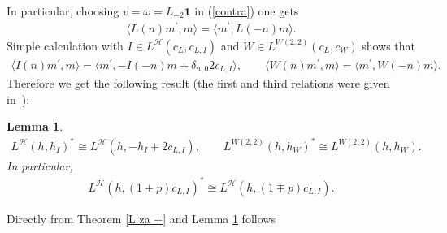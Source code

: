 \documentclass[11pt]{article}
\numberwithin{equation}{section}
\newtheorem{Lemma}[Theorem]{Lemma}
\newcommand{\HVir}{\mathcal H}
\begin{document}
In particular, choosing $v=\omega =L_{-2}\boldsymbol{1}$ in (\ref{contra}) one gets
\begin{gather*}
\langle L(n) m^{\prime },m\rangle =\langle m^{\prime },L(-n) m\rangle .
\end{gather*}
Simple calculation with $I\in L^{\HVir}(c_{L},c_{L,I}) $ and $W\in L^{W(2,2) } ( c_{L},c_{W} ) $ shows that
\begin{gather*}
\langle I(n) m^{\prime },m\rangle = \langle m^{\prime },-I(-n) m+\delta _{n,0}2c_{L,I} \rangle , \qquad
\langle W(n) m^{\prime },m\rangle =\langle m^{\prime },W(-n) m\rangle .
\end{gather*}
Therefore we get the following result (the f\/irst and third relations were given in~\cite{nas}):

\begin{Lemma}\label{duali}
\begin{gather*}
L^{\HVir}(h,h_{I})^{\ast} \cong L^{\HVir}(h,-h_{I}+2c_{L,I}),\qquad
L^{W(2,2) }(h,h_{W})^{\ast} \cong L^{W(2,2) }(h,h_{W}) .
\end{gather*}
In particular,
\begin{gather*}
L^{\HVir}(h,(1\pm p) c_{L,I})^{\ast}\cong L^{\HVir}(h,(1\mp p) c_{L,I}).
\end{gather*}
\end{Lemma}

Directly from Theorem \ref{L za +} and Lemma \ref{duali} follows
\end{document}

